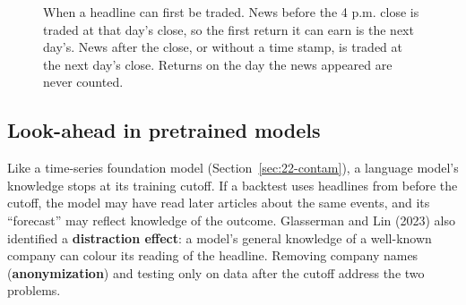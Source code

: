 \begin{figure}[htbp]
\centering
{}
\caption{When a headline can first be traded. News before the 4 p.m. close is traded at that day's close, so the first return it can earn is the next day's. News after the close, or without a time stamp, is traded at the next day's close. Returns on the day the news appeared are never counted.}
\label{fig:23-timing}
\end{figure}

\subsection{Look-ahead in pretrained models}

Like a time-series foundation model (Section~\ref{sec:22-contam}), a language model's knowledge stops at its training cutoff. If a backtest uses headlines from before the cutoff, the model may have read later articles about the same events, and its ``forecast'' may reflect knowledge of the outcome. Glasserman and Lin (2023) also identified a \textbf{distraction effect}: a model's general knowledge of a well-known company can colour its reading of the headline. Removing company names (\textbf{anonymization}) and testing only on data after the cutoff address the two problems.

